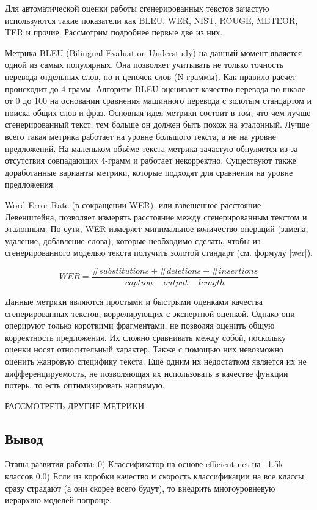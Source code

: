 \documentclass[a4paper,12pt]{extarticle}
\begin{document}
Для автоматической оценки работы сгенерированных текстов зачастую используются такие показатели как BLEU, WER, NIST, ROUGE, METEOR, TER и прочие. Рассмотрим подробнее первые две из них.

Метрика BLEU (Bilingual Evaluation Understudy) на данный момент является одной из самых популярных. Она позволяет учитывать не только точность перевода отдельных слов, но и цепочек слов (N-граммы). Как правило расчет происходит до 4-грамм. Алгоритм BLEU оценивает качество перевода по шкале от 0 до 100 на основании сравнения машинного перевода с золотым стандартом и поиска общих слов и фраз. Основная идея метрики состоит в том, что чем лучше сгенерированный текст, тем больше он должен быть похож на эталонный. Лучше всего такая метрика работает на уровне большого текста, а не на уровне предложений. На маленьком объёме текста метрика зачастую обнуляется из-за отсутствия совпадающих 4-грамм и работает некорректно. Существуют также доработанные варианты метрики, которые подходят для сравнения на уровне предложения.

Word Error Rate (в сокращении WER), или взвешенное расстояние Левенштейна, позволяет измерять расстояние между сгенерированным текстом и эталонным. По сути, WER измеряет минимальное количество операций (замена, удаление, добавление слова), которые необходимо сделать, чтобы из сгенерированного моделью текста получить золотой стандарт (см. формулу \ref{wer}).

\begin{equation}
	\label{wer}	
	WER = \frac{\#substitutions + \#deletions + \#insertions}{caption-output-lemgth}
\end{equation}

Данные метрики являются простыми и быстрыми оценками качества сгенерированных текстов, коррелирующих с экспертной оценкой. Однако они оперируют только короткими фрагментами, не позволяя оценить общую корректность предложения. Их сложно сравнивать между собой, поскольку оценки носят относительный характер. Также с помощью них невозможно оценить жанровую специфику текста. Еще одним их недостатком является их не дифференцируемость, не позволяющая их использовать в качестве функции потерь, то есть оптимизировать напрямую.

РАССМОТРЕТЬ ДРУГИЕ МЕТРИКИ

\subsection{Вывод}

Этапы развития работы:
0) Классификатор на основе efficient net на ~1.5k классов
0.0) Если из коробки качество и скорость классификации на все классы сразу страдают (а они скорее всего будут), то внедрить многоуровневую иерархию моделей попроще.
\end{document}
